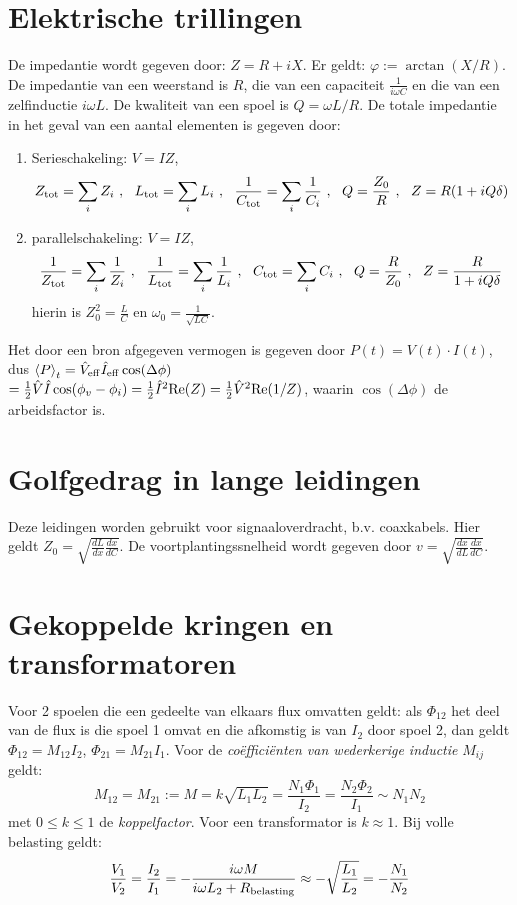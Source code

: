 \documentclass[twoside]{report}
\begin{document}
\section{Elektrische trillingen}
De impedantie wordt gegeven door: $Z=R+iX$. Er geldt: $\varphi:=\arctan(X/R)$.
De impedantie van een weerstand is $R$, die van een capaciteit $\displaystyle
\frac{1}{i\omega C}$ en die van een zelfinductie $i\omega L$. De kwaliteit
van een spoel is $Q=\omega L/R$. De totale impedantie in het geval van een
aantal elementen is gegeven door:
\begin{enumerate}
\item Serieschakeling: $V=IZ$,
\[
Z_{\rm tot}=\sum_i Z_i~,~~L_{\rm tot}=\sum_i L_i~,~~
\frac{1}{C_{\rm tot}}=\sum_i\frac{1}{C_i}~,~~Q=\frac{Z_0}{R}~,~~
Z=R(1+iQ\delta)
\]
\item parallelschakeling: $V=IZ$,
\[
\frac{1}{Z_{\rm tot}}=\sum_i\frac{1}{Z_i}~,~~
\frac{1}{L_{\rm tot}}=\sum_i\frac{1}{L_i}~,~~
C_{\rm tot}=\sum_i C_i~,~~Q=\frac{R}{Z_0}~,~~
Z=\frac{R}{1+iQ\delta}
\]
hierin is $\displaystyle Z_0^2=\frac{L}{C}$ en
$\displaystyle\omega_0=\frac{1}{\sqrt{LC}}$.
\end{enumerate}
Het door een bron afgegeven vermogen is gegeven door $P(t)=V(t)\cdot I(t)$,
dus $\left\langle P \right\rangle_t=\hat{V}_{\rm eff}\hat{I}_{\rm eff}\cos(\Delta\phi)$\\
$=\mbox{$\frac{1}{2}$}\hat{V}\hat{I}\cos(\phi_v-\phi_i)=\mbox{$\frac{1}{2}$}\hat{I}^2{\rm Re}(Z)=
\mbox{$\frac{1}{2}$}\hat{V}^2{\rm Re}(1/Z)$, waarin $\cos(\Delta\phi)$ de arbeidsfactor is.

\section{Golfgedrag in lange leidingen}
Deze leidingen worden gebruikt voor signaaloverdracht, b.v. coaxkabels. Hier
geldt $\displaystyle Z_0=\sqrt{\frac{dL}{dx}\frac{dx}{dC}}$. De
voortplantingssnelheid wordt gegeven door
$\displaystyle v=\sqrt{\frac{dx}{dL}\frac{dx}{dC}}$.

\section{Gekoppelde kringen en transformatoren}
Voor 2 spoelen die een gedeelte van elkaars flux omvatten geldt: als
$\Phi_{12}$ het deel van de flux is die spoel 1 omvat en die afkomstig is van
$I_2$ door spoel 2, dan geldt $\Phi_{12}=M_{12}I_2$, $\Phi_{21}=M_{21}I_1$.
Voor de {\it co\"effici\"enten van wederkerige inductie} $M_{ij}$ geldt:
\[
M_{12}=M_{21}:=M=k\sqrt{L_1L_2}=\frac{N_1\Phi_1}{I_2}=\frac{N_2\Phi_2}{I_1}\sim N_1N_2
\]
met $0\leq k\leq1$ de {\it koppelfactor}. Voor een transformator is
$k\approx1$. Bij volle belasting geldt:
\[
\frac{V_1}{V_2}=\frac{I_2}{I_1}=-\frac{i\omega M}{i\omega L_2+R_{\rm belasting}}\approx-\sqrt{\frac{L_1}{L_2}}=-\frac{N_1}{N_2}
\]
\end{document}

